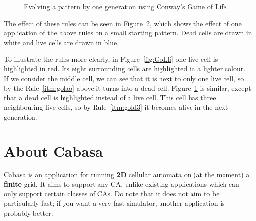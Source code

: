 \documentclass[oneside,a4paper]{memoir}
\newcommand{\grid}[2][blue!75]{
\fill[#1]
  \foreach \row [count=\y] in {#2} {
    \foreach \cell [count=\x] in \row {
      \ifnum\cell=1 %
        (\x-1, -\y+1) rectangle ++(1, -1)
      \fi
      \pgfextra{%
        \global\let\maxx\x
        \global\let\maxy\y
      }%
    }
  }
;
\draw[thin] (0, 0) grid[step=1] (\maxx, -\maxy);
}
\begin{document}
\begin{figure}
\begin{subfigure}{\linewidth}
    \label{fig:GoLdi}
  \end{subfigure}
  \caption{Evolving a pattern by one generation using Conway's Game of Life}
  \label{fig:GoL}
\end{figure}

The effect of these rules can be seen in Figure~\ref{fig:GoL},
  which shows the effect of one application of the above rules on a small starting pattern.
Dead cells are drawn in white and live cells are drawn in blue.

To illustrate the rules more clearly, in Figure~\ref{fig:GoLli} one live cell is highlighted in red.
Its eight surrounding cells are highlighted in a lighter colour.
If we consider the middle cell, we can see that it is next to only one live cell,
  so by the Rule~\ref{itm:golao} above it turns into a dead cell.
Figure~\ref{fig:GoLdi} is similar, except that a dead cell is highlighted instead of a live cell.
This cell has three neighbouring live cells, so by Rule~\ref{itm:gold3} it becomes alive in the next generation.

\section{About Cabasa}
\label{sec:about}

Cabasa is an application for running \textbf{2D} cellular automata on (at the moment) a \textbf{finite} grid.
It aims to support any CA, unlike existing applications which can only support certain classes of CAs.
Do note that it does not aim to be particularly fast; if you want a very fast simulator, another application is probably better.
\end{document}

